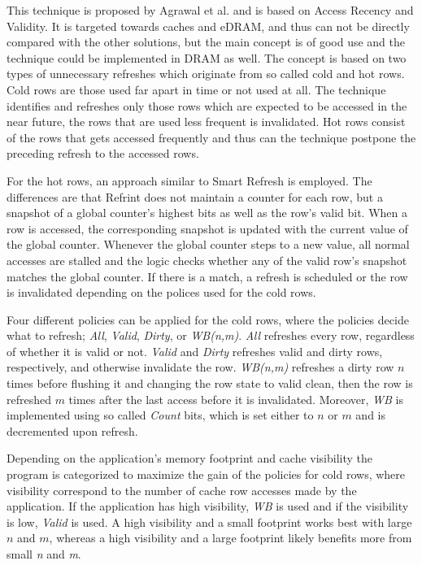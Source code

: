 This technique is proposed by Agrawal et al. \cite{refrint} and is based on Access Recency and Validity. It is targeted towards caches and eDRAM, and thus can not be directly compared with the other solutions, but the main concept is of good use and the technique could be implemented in DRAM as well. The concept is based on two types of unnecessary refreshes which originate from so called cold and hot rows. Cold rows are those used far apart in time or not used at all. The technique identifies and refreshes only those rows which are expected to be accessed in the near future, the rows that are used less frequent is invalidated. Hot rows consist of the rows that gets accessed frequently and thus can the technique postpone the preceding refresh to the accessed rows.

For the hot rows, an approach similar to Smart Refresh is employed. The differences are that Refrint does not maintain a counter for each row, but a snapshot of a global counter's highest bits as well as the row's valid bit. When a row is accessed, the corresponding snapshot is updated with the current value of the global counter. Whenever the global counter steps to a new value, all normal accesses are stalled and the logic checks whether any of the valid row's snapshot matches the global counter. If there is a match, a refresh is scheduled or the row is invalidated depending on the polices used for the cold rows. 

Four different policies can be applied for the cold rows, where the policies decide what to refresh; \textit{All}, \textit{Valid}, \textit{Dirty}, or \textit{WB(n,m)}. \textit{All} refreshes every row, regardless of whether it is valid or not. \textit{Valid} and \textit{Dirty} refreshes valid and dirty rows, respectively, and otherwise invalidate the row. \textit{WB(n,m)} refreshes a dirty row $n$ times before flushing it and changing the row state to valid clean, then the row is refreshed $m$ times after the last access before it is invalidated. Moreover, \textit{WB} is implemented using so called \textit{Count} bits, which is set either to $n$ or $m$ and is decremented upon refresh. %

Depending on the application's memory footprint and cache visibility the program is categorized to maximize the gain of the policies for cold rows, where visibility correspond to the number of cache row accesses made by the application. If the application has high visibility, \textit{WB} is used and if the visibility is low, \textit{Valid} is used. A high visibility and a small footprint works best with large $n$ and $m$, whereas a high visibility and a large footprint likely benefits more from small \textit{n} and \textit{m}. 

